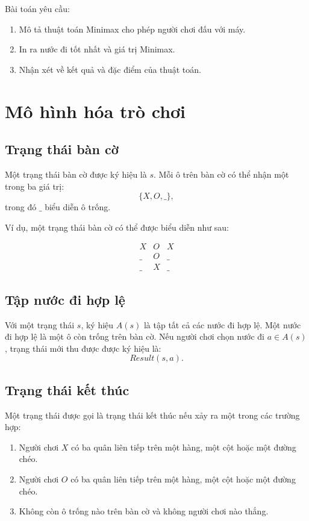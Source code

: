 \documentclass[12pt,a4paper]{article}
\newcommand{\blank}{\_}
\newcommand{\board}[9]{
\[
\begin{array}{c|c|c}
#1 & #2 & #3\\ \hline
#4 & #5 & #6\\ \hline
#7 & #8 & #9
\end{array}
\]
}
\begin{document}
Bài toán yêu cầu:
\begin{enumerate}[label=\arabic*.]
    \item Mô tả thuật toán Minimax cho phép người chơi đấu với máy.
    \item In ra nước đi tốt nhất và giá trị Minimax.
    \item Nhận xét về kết quả và đặc điểm của thuật toán.
\end{enumerate}

\section{Mô hình hóa trò chơi}

\subsection{Trạng thái bàn cờ}

Một trạng thái bàn cờ được ký hiệu là $s$.
Mỗi ô trên bàn cờ có thể nhận một trong ba giá trị:
\[
\{X, O, \blank\},
\]
trong đó $\blank$ biểu diễn ô trống.

Ví dụ, một trạng thái bàn cờ có thể được biểu diễn như sau:
\board{X}{O}{X}{\blank}{O}{\blank}{\blank}{X}{\blank}

\subsection{Tập nước đi hợp lệ}

Với một trạng thái $s$, ký hiệu $A(s)$ là tập tất cả các nước đi hợp lệ.
Một nước đi hợp lệ là một ô còn trống trên bàn cờ.
Nếu người chơi chọn nước đi $a \in A(s)$, trạng thái mới thu được được ký hiệu là:
\[
Result(s,a).
\]

\subsection{Trạng thái kết thúc}

Một trạng thái được gọi là trạng thái kết thúc nếu xảy ra một trong các trường hợp:
\begin{enumerate}[label=\arabic*.]
    \item Người chơi $X$ có ba quân liên tiếp trên một hàng, một cột hoặc một đường chéo.
    \item Người chơi $O$ có ba quân liên tiếp trên một hàng, một cột hoặc một đường chéo.
    \item Không còn ô trống nào trên bàn cờ và không người chơi nào thắng.
\end{enumerate}
\end{document}
